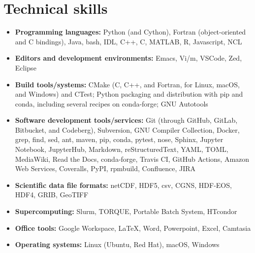 \section{Technical skills}
\vspace{0.5em}

\begin{itemize}

  \item \textbf{Programming languages:} Python (and Cython),
    Fortran (object-oriented and C bindings), Java, bash,
    IDL, C++, C, MATLAB, R, Javascript, NCL

  \item \textbf{Editors and development environments:} Emacs, Vi/m, VSCode,
    Zed, Eclipse

  \item \textbf{Build tools/systems:} CMake (C, C++, and Fortran, for Linux, macOS,
    and Windows) and CTest; Python packaging and distribution with pip and conda,
    including several recipes on conda-forge; GNU Autotools

  \item \textbf{Software development tools/services:} Git (through GitHub,
    GitLab, Bitbucket, and Codeberg), Subversion, GNU Compiler Collection, Docker, grep,
    find, sed, ant, maven, pip, conda, pytest, nose, Sphinx, Jupyter Notebook,
    JupyterHub, Markdown, reStructuredText, YAML, TOML, MediaWiki, Read the
    Docs, conda-forge, {Travis CI}, {GitHub Actions}, {Amazon Web Services},
    Coveralls, PyPI, rpmbuild, Confluence, JIRA

  \item \textbf{Scientific data file formats:} netCDF, HDF5, csv, CGNS, HDF-EOS,
    HDF4, GRIB, GeoTIFF

  \item \textbf{Supercomputing:} Slurm, TORQUE, Portable Batch System, HTcondor

  \item \textbf{Office tools:} Google Workspace, \LaTeX, Word, Powerpoint,
   Excel, Camtasia

  \item \textbf{Operating systems:} Linux (Ubuntu, Red Hat), macOS, Windows

\end{itemize}
